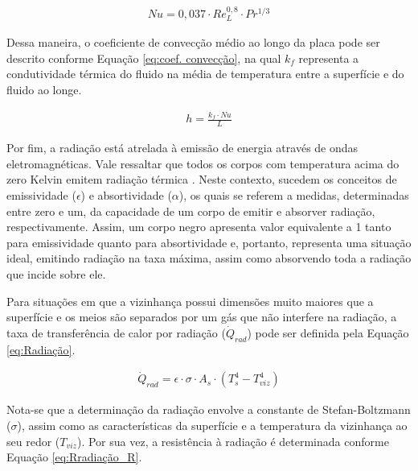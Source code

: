 \documentclass[acronym,symbols,table]{fei}
\begin{document}
\begin{equation} \label{eq:Nusselt_Turbulento}
\begin{aligned}
    Nu=0,037 \cdot Re_{L}^{0,8} \cdot Pr^{1/3}
\end{aligned}
\end{equation}

Dessa maneira, o coeficiente de convecção médio ao longo da placa pode ser descrito conforme Equação \ref{eq:coef. convecção}, na qual $k_{f}$ representa a condutividade térmica do fluido na média de temperatura entre a superfície e do fluido ao longe.

\begin{equation} \label{eq:coef. convecção}
\begin{aligned}
    h=\frac{k_{f} \cdot Nu}{L}
\end{aligned}
\end{equation}

Por fim, a radiação está atrelada à emissão de energia através de ondas eletromagnéticas. Vale ressaltar que todos os corpos com temperatura acima do zero Kelvin emitem radiação térmica \cite{kreith1999mechanical}. Neste contexto, sucedem os conceitos de emissividade ($\epsilon$) e absortividade ($\alpha$), os quais se referem a medidas, determinadas entre zero e um, da capacidade de um corpo de emitir e absorver radiação, respectivamente. Assim, um corpo negro apresenta valor equivalente a 1 tanto para emissividade quanto para absortividade e, portanto, representa uma situação ideal, emitindo radiação na taxa máxima, assim como absorvendo toda a radiação que incide sobre ele. 

Para situações em que a vizinhança possui dimensões muito maiores que a superfície e os meios são separados por um gás que não interfere na radiação, a taxa de transferência de calor por radiação ($\dot{Q}_{rad}$) pode ser definida pela Equação \ref{eq:Radiação}.

\begin{equation} \label{eq:Radiação}
\begin{aligned}
    \dot{Q}_{rad}=\epsilon \cdot \sigma \cdot A_{s} \cdot (T_{s}^4-T_{viz}^4)
\end{aligned}
\end{equation}

Nota-se que a determinação da radiação envolve a constante de Stefan-Boltzmann ($\sigma$), assim como as características da superfície e a temperatura da vizinhança ao seu redor ($T_{viz}$). Por sua vez, a resistência à radiação é determinada conforme Equação \ref{eq:Rradiação_R}.
\end{document}
